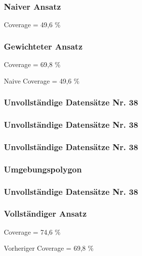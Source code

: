 \begin{frame}
  \frametitle{Naiver Ansatz}
  \begin{center}
  \huge{Coverage = 49,6 \%}
  \end{center}
\end{frame}

\begin{frame}
  \frametitle{Gewichteter Ansatz}
  \begin{center}
  \huge{Coverage = 69,8 \%}
  \end{center}
  \begin{center}
  Naive Coverage = 49,6 \%
  \end{center}
\end{frame}


\begin{frame}
  \frametitle{Unvollständige Datensätze \hfill Nr. 38}
\end{frame}


\begin{frame}
  \frametitle{Unvollständige Datensätze \hfill Nr. 38}
\end{frame}


\begin{frame}
  \frametitle{Unvollständige Datensätze \hfill Nr. 38}
\end{frame}


\begin{frame}
  \frametitle{Umgebungspolygon}
\end{frame}


\begin{frame}
  \frametitle{Unvollständige Datensätze \hfill Nr. 38}
\end{frame}


\begin{frame}
  \frametitle{Vollständiger Ansatz}
  \begin{center}
  \huge{Coverage = 74,6 \%}
  \end{center}
  \begin{center}
  Vorheriger Coverage =  69,8 \%
  \end{center}
\end{frame}

